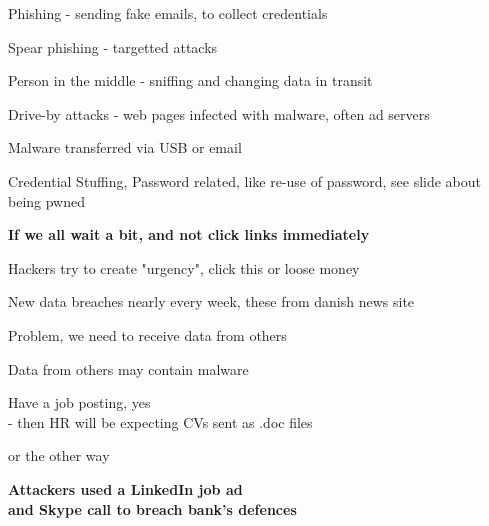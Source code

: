 \documentclass[Screen16to9,17pt,footrule]{foils}
\begin{document}
\begin{list2}
\item Phishing - sending fake emails, to collect credentials
\item Spear phishing - targetted attacks
\item Person in the middle - sniffing and changing data in transit
\item Drive-by attacks - web pages infected with malware, often ad servers
\item Malware transferred via USB or email
\item Credential Stuffing, Password related, like re-use of password, see slide about being pwned
\end{list2}

\vskip 1cm
\centerline{\Large\bf If we all wait a bit, and not click links immediately}

\vskip 1cm
Hackers try to create "urgency", click this or loose money



New data breaches nearly every week, these from danish news site 

Problem, we need to receive data from others

Data from others may contain malware

Have a job posting, yes\\
- then HR will be expecting CVs sent as .doc files

\slide{}

or the other way

{\Large\bf Attackers used a LinkedIn job ad\\
and Skype call to breach bank’s defences}

{\footnotesize
{}}

\myquestionspage
\end{document}
